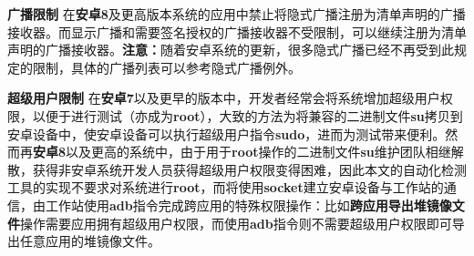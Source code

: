 \textbf{广播限制 }\cite{android-receiver-limit} 在\textbf{安卓8}及更高版本系统的应用中禁止将隐式广播注册为清单声明的广播接收器。而显示广播和需要签名授权的广播接收器不受限制，可以继续注册为清单声明的广播接收器。\textbf{注意：}随着安卓系统的更新，很多隐式广播已经不再受到此规定的限制，具体的广播列表可以参考隐式广播例外\cite{android-receiver-limit-exception}。

\textbf{超级用户限制 } 在\textbf{安卓7}以及更早的版本中，开发者经常会将系统增加超级用户权限，以便于进行测试（亦成为\textbf{root}），大致的方法为将兼容的二进制文件\textbf{su}拷贝到安卓设备中，使安卓设备可以执行超级用户指令\textbf{sudo}，进而为测试带来便利。然而再\textbf{安卓8}以及更高的系统中，由于用于\textbf{root}操作的二进制文件\textbf{su}维护团队相继解散，获得非安卓系统开发人员获得超级用户权限变得困难，因此本文的自动化检测工具的实现不要求对系统进行\textbf{root}，而将使用\textbf{socket}建立安卓设备与工作站的通信，由工作站使用\textbf{adb}指令完成跨应用的特殊权限操作：比如\textbf{跨应用导出堆镜像文件}操作需要应用拥有超级用户权限，而使用\textbf{adb}指令则不需要超级用户权限即可导出任意应用的堆镜像文件。